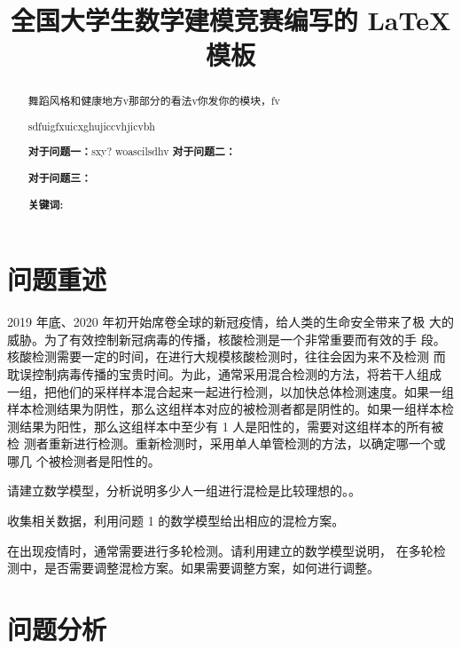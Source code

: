 \documentclass[withoutpreface,bwprint]{cumcmthesis} %
\title{全国大学生数学建模竞赛编写的 \LaTeX{} 模板}
\begin{document}
\maketitle
\begin{abstract}



舞蹈风格和健康地方v那部分的看法v你发你的模块，fv


sdfuigfxuicxghujiccvhjicvbh

\textbf{对于问题一：}sxy?
woascilsdhv
\textbf{对于问题二：}

\textbf{对于问题三：}

\textbf{关键词:}
\end{abstract}



\section{问题重述}
2019 年底、2020 年初开始席卷全球的新冠疫情，给人类的生命安全带来了极
大的威胁。为了有效控制新冠病毒的传播，核酸检测是一个非常重要而有效的手
段。核酸检测需要一定的时间，在进行大规模核酸检测时，往往会因为来不及检测
而耽误控制病毒传播的宝贵时间。为此，通常采用混合检测的方法，将若干人组成
一组，把他们的采样样本混合起来一起进行检测，以加快总体检测速度。如果一组
样本检测结果为阴性，那么这组样本对应的被检测者都是阴性的。如果一组样本检
测结果为阳性，那么这组样本中至少有 1 人是阳性的，需要对这组样本的所有被检
测者重新进行检测。重新检测时，采用单人单管检测的方法，以确定哪一个或哪几
个被检测者是阳性的。

 \begin{problem}
请建立数学模型，分析说明多少人一组进行混检是比较理想的。。
 \end{problem}
 \begin{problem}
收集相关数据，利用问题 1 的数学模型给出相应的混检方案。
 \end{problem}
 \begin{problem}
在出现疫情时，通常需要进行多轮检测。请利用建立的数学模型说明，
在多轮检测中，是否需要调整混检方案。如果需要调整方案，如何进行调整。
\end{problem}

\section{问题分析}
\end{document}
